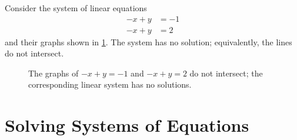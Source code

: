 \documentclass{article}
\begin{document}
\begin{example}
    Consider the system of linear equations
    \begin{align*}
        -x+y&=-1 \\
        -x+y&=2
    \end{align*}
    and their graphs shown in \cref{fig:linear-system-3}. The system has no solution; equivalently, the lines do not intersect.

\begin{figure}[H]
    \centering
    \caption{The graphs of \(-x+y=-1\) and \(-x+y=2\) do not intersect; the corresponding linear system has no solutions.}
    \label{fig:linear-system-3}
\end{figure}
\end{example}

\section{Solving Systems of Equations}\label{sec:solving-systems}
\end{document}
